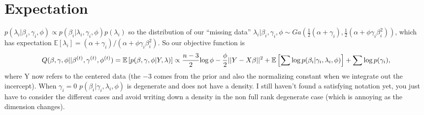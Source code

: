 \documentclass[6pt]{article}
\def\log{{\rm log \,}}
\begin{document}
\section{Expectation}
$p(\lambda_{i}|\beta_{i},\gamma_{i},\phi)\propto p(\beta_{i}|\lambda_{i},\gamma_{i},\phi)p(\lambda_{i})$ so the distribution of our ``missing data'' $\lambda_{i}|\beta_{i},\gamma_{i},\phi \sim Ga\left( \frac{1}{2}(\alpha+\gamma_{i}),\frac{1}{2}(\alpha+\phi\gamma_{i}\beta_{i}^{2}) \right)$, which has expectation $\mathbb{E}[\lambda_{i}]=(\alpha+\gamma_{i})/(\alpha+\phi\gamma_{i}\beta_{i}^{2})$. So our objective function is
\begin{align*}
	Q(\beta,\gamma,\phi||\beta^{(t)},\gamma^{(t)},\phi^{(t)})=\mathbb{E}\left[ p(\beta,\gamma,\phi|Y,\lambda) \right]\propto \frac{n-3}{2}\log \phi -\frac{\phi}{2}||Y-X\beta||^{2}+\mathbb{E}\left[ \sum \log p(\beta_{i}|\gamma_{i},\lambda_{i},\phi) \right] + \sum \log p(\gamma_{i}),
\end{align*}
where Y now refers to the centered data (the $-3$ comes from the prior and also the normalizing constant when we integrate out the incercept). When $\gamma_{i}=0$ $p(\beta_{i}|\gamma_{i},\lambda_{i},\phi)$ is degenerate and does not have a density. I still haven't found a satisfying notation yet, you just have to consider the different cases and avoid writing down a density in the non full rank degenerate case (which is annoying as the dimension changes).
\end{document}
